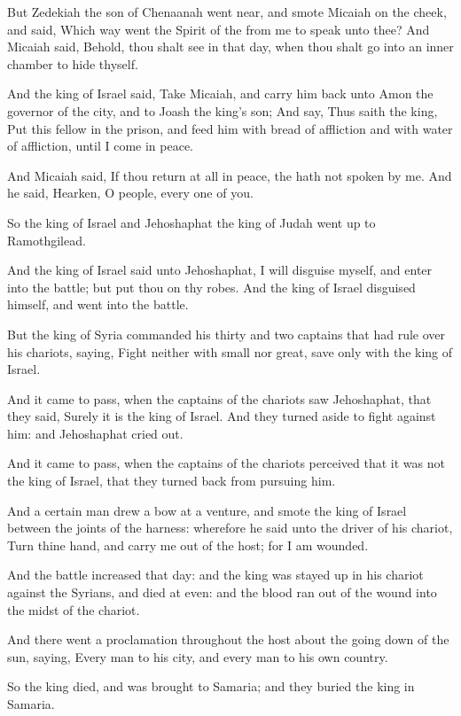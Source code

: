 \Verse But Zedekiah the son of Chenaanah went near, and smote Micaiah on the cheek, and said, Which way went the Spirit of the \LORD from me to speak unto thee?  \Verse And Micaiah said, Behold, thou shalt see in that day, when thou shalt go into an inner chamber to hide thyself.

\Verse And the king of Israel said, Take Micaiah, and carry him back unto Amon the governor of the city, and to Joash the king's son; \Verse And say, Thus saith the king, Put this fellow in the prison, and feed him with bread of affliction and with water of affliction, until I come in peace.

\Verse And Micaiah said, If thou return at all in peace, the \LORD hath not spoken by me. And he said, Hearken, O people, every one of you.

\Verse So the king of Israel and Jehoshaphat the king of Judah went up to Ramothgilead.

\Verse And the king of Israel said unto Jehoshaphat, I will disguise myself, and enter into the battle; but put thou on thy robes. And the king of Israel disguised himself, and went into the battle.

\Verse But the king of Syria commanded his thirty and two captains that had rule over his chariots, saying, Fight neither with small nor great, save only with the king of Israel.

\Verse And it came to pass, when the captains of the chariots saw Jehoshaphat, that they said, Surely it is the king of Israel. And they turned aside to fight against him: and Jehoshaphat cried out.

\Verse And it came to pass, when the captains of the chariots perceived that it was not the king of Israel, that they turned back from pursuing him.

\Verse And a certain man drew a bow at a venture, and smote the king of Israel between the joints of the harness: wherefore he said unto the driver of his chariot, Turn thine hand, and carry me out of the host; for I am wounded.

\Verse And the battle increased that day: and the king was stayed up in his chariot against the Syrians, and died at even: and the blood ran out of the wound into the midst of the chariot.

\Verse And there went a proclamation throughout the host about the going down of the sun, saying, Every man to his city, and every man to his own country.

\Verse So the king died, and was brought to Samaria; and they buried the king in Samaria.

